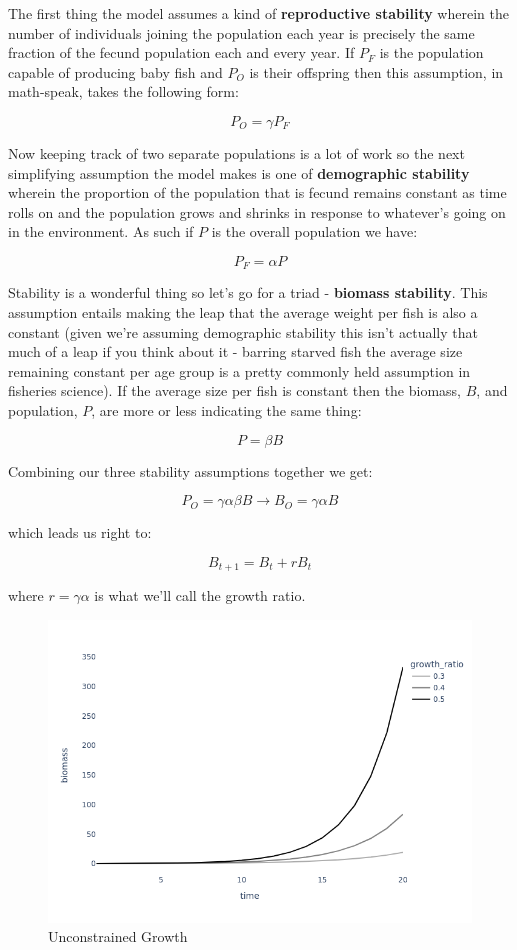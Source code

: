 \documentclass[11pt,a5paper]{book}
\begin{document}
The first thing the model assumes a kind of \textbf{reproductive stability} wherein the number of individuals joining the population each year is precisely the same fraction of the fecund population each and every year. If $P_F$ is the population capable of producing baby fish and $P_O$ is their offspring then this assumption, in math-speak, takes the following form:

$$P_O = \gamma P_F$$

Now keeping track of two separate populations is a lot of work so the next simplifying assumption the model makes is one of \textbf{demographic stability} wherein the proportion of the population that is fecund remains constant as time rolls on and the population grows and shrinks in response to whatever's going on in the environment. As such if $P$ is the overall population we have:

$$P_F = \alpha P$$

Stability is a wonderful thing so let's go for a triad - \textbf{biomass stability}. This assumption entails making the leap that the average weight per fish is also a constant (given we're assuming demographic stability this isn't actually that much of a leap if you think about it - barring starved fish the average size remaining constant per age group is a pretty commonly held assumption in fisheries science). If the average size per fish is constant then the biomass, $B$, and population, $P$, are more or less indicating the same thing:

$$P = \beta B$$

Combining our three stability assumptions together we get:

$$P_O = \gamma \alpha \beta B \rightarrow B_O = \gamma \alpha B $$

which leads us right to:

$$B_{t+1} = B_{t} + rB_t$$

where $r=\gamma \alpha$ is what we'll call the growth ratio. 
\newline

\begin{figure}[h!] 
  \includegraphics[width=\linewidth]{notebooks/SurplusModels/exponential_growth.png}
  \caption{Unconstrained Growth}
  \label{fig:unconstrained_growth}
\end{figure}
\end{document}
